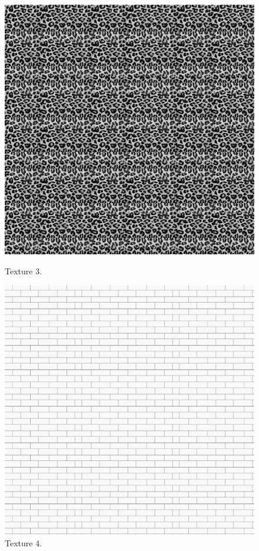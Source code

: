 \documentclass[12pt,a4paper,notitlepage,oneside,amsmath,amssymb]{article}
\begin{document}
\begin{CJK*}{UTF8}{bkai}
\begin{enumerate}[label=(\alph*)]
\begin{figure}[hbt!]
	\begin{minipage}{.25\textwidth}
		\centering
		\includegraphics[width=.85\linewidth]{synthesized_texture3}
		\caption*{Texture 3.}
	\end{minipage}%
	\begin{minipage}{.25\textwidth}
		\centering
		\includegraphics[width=.85\linewidth]{synthesized_texture4}
		\caption*{Texture 4.}
	\end{minipage}
\end{figure}


\end{enumerate}
\end{CJK*}
\end{document}
